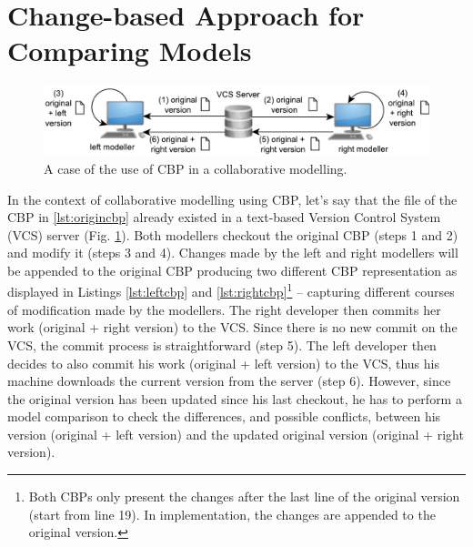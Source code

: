\documentclass{jot}
\begin{document}
\vspace{-20pt}
\section{Change-based Approach for Comparing Models}
\label{sec:change_based_approach_for_comparing_models}

\vspace{-20pt}
\begin{figure}
    \includegraphics[width=\linewidth]{VCS}
    \caption{A case of the use of CBP in a collaborative modelling.}
    \label{fig:vcs}
\end{figure}

\vspace{-10pt}
In the context of collaborative modelling using CBP, let's say that the file of the CBP in \ref{lst:origincbp} already existed in a text-based Version Control System (VCS) server (Fig. \ref{fig:vcs}). Both modellers checkout the original CBP (steps 1 and 2) and modify it (steps 3 and 4). Changes made by the left and right modellers will be appended to the original CBP producing two different CBP representation as displayed in Listings \ref{lst:leftcbp} and \ref{lst:rightcbp}\footnote{Both CBPs only present the changes after the last line of the original version (start from line 19). In implementation, the changes are appended to the original version.} -- capturing different courses of modification made by the modellers. The right developer then commits her work (original + right version) to the VCS. Since there is no new commit on the VCS, the commit process is straightforward (step 5). The left developer then decides to also commit his work (original + left version) to the VCS, thus his machine downloads the current version from the server (step 6). However, since the original version has been updated since his last checkout, he has to perform a model comparison to check the differences, and possible conflicts, between his version (original + left version) and the updated original version (original + right version). 
\end{document}

